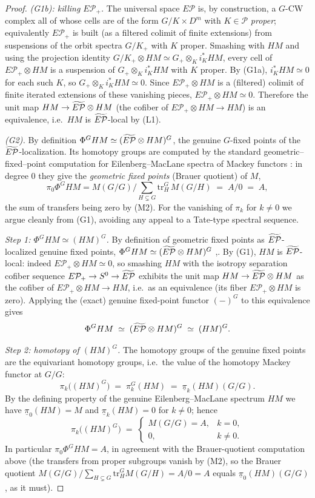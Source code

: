 \begin{proof}
\emph{(G1b): killing $E\mathcal P_+$.} The universal space $E\mathcal P$ is, by
construction, a $G$-CW complex all of whose cells are of the form
$G/K\times D^m$ with $K\in\mathcal P$ \emph{proper}; equivalently
$E\mathcal P_+$ is built (as a filtered colimit of finite extensions) from
suspensions of the orbit spectra $G/K_+$ with $K$ proper. Smashing with $HM$ and
using the projection identity $G/K_+\otimes HM\simeq
G_+\otimes_K i_K^\ast HM$, every cell of $E\mathcal P_+\otimes HM$ is a suspension
of $G_+\otimes_K i_K^\ast HM$ with $K$ proper. By (G1a), $i_K^\ast HM\simeq 0$ for
each such $K$, so $G_+\otimes_K i_K^\ast HM\simeq 0$. Since
$E\mathcal P_+\otimes HM$ is a (filtered) colimit of finite iterated extensions
of these vanishing pieces, $E\mathcal P_+\otimes HM\simeq 0$. Therefore the unit
map $HM\to\widetilde{E\mathcal P}\otimes HM$ (the cofiber of $E\mathcal P_+\otimes HM\to HM$) is an
equivalence, i.e.\ $HM$ is $\widetilde{E\mathcal P}$-local by (L1).

\emph{(G2).} By definition $\Phi^G HM\simeq(\widetilde{E\mathcal P}\otimes HM)^G$, the genuine
$G$-fixed points of the $\widetilde{E\mathcal P}$-localization. Its homotopy groups are computed
by the standard geometric--fixed--point computation for Eilenberg--MacLane
spectra of Mackey functors \cite[\S6]{HillPrimer}: in degree $0$ they give the
\emph{geometric fixed points} (Brauer quotient) of $M$,
\[
\pi_0\Phi^G HM= M(G/G)\Big/\!\sum_{H\subsetneq G}\mathrm{tr}^G_H\,M(G/H)
\;=\;A/0\;=\;A,
\]
the sum of transfers being zero by (M2). For the vanishing of $\pi_k$ for $k\ne 0$ we argue cleanly from (G1), avoiding
any appeal to a Tate-type spectral sequence.

\emph{Step 1: $\Phi^G HM\simeq (HM)^G$.} By definition of geometric fixed points
as $\widetilde{E\mathcal P}$-localized genuine fixed points,
$\Phi^G HM\simeq(\widetilde{E\mathcal P}\otimes HM)^G$
\cite[\S2.5.2]{HHR16},\cite[\S6]{HillPrimer}. By (G1), $HM$ is $\widetilde{E\mathcal P}$-local:
indeed $E\mathcal P_+\otimes HM\simeq 0$, so smashing $HM$ with the isotropy
separation cofiber sequence $E\mathcal P_+\to S^0\to\widetilde{E\mathcal P}$ exhibits the unit
map $HM\to\widetilde{E\mathcal P}\otimes HM$ as the cofiber of $E\mathcal P_+\otimes HM\to HM$,
i.e.\ as an equivalence (its fiber $E\mathcal P_+\otimes HM$ is zero). Applying
the (exact) genuine fixed-point functor $(-)^G$ to this equivalence gives
\[
\Phi^G HM\;\simeq\;(\widetilde{E\mathcal P}\otimes HM)^G\;\simeq\;(HM)^G .
\]

\emph{Step 2: homotopy of $(HM)^G$.} The homotopy groups of the genuine fixed
points are the equivariant homotopy groups, i.e.\ the value of the homotopy
Mackey functor at $G/G$:
\[
\pi_k\bigl((HM)^G\bigr)\;=\;\pi_k^G(HM)\;=\;\underline\pi_k(HM)(G/G).
\]
By the defining property of the genuine Eilenberg--MacLane spectrum $HM$ we have
$\underline\pi_0(HM)=M$ and $\underline\pi_k(HM)=0$ for $k\ne 0$; hence
\[
\pi_k\bigl((HM)^G\bigr)\;=\;
\begin{cases}
M(G/G)=A, & k=0,\\[2pt]
0, & k\ne 0.
\end{cases}
\]
In particular $\pi_0\Phi^G HM=A$, in agreement with the Brauer-quotient
computation above (the transfers from proper subgroups vanish by (M2), so the
Brauer quotient $M(G/G)/\sum_{H\subsetneq G}\mathrm{tr}^G_H M(G/H)=A/0=A$ equals
$\underline\pi_0(HM)(G/G)$, as it must).


\end{proof}
